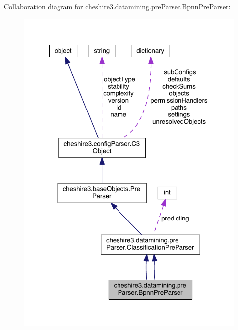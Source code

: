 Collaboration diagram for cheshire3.\-datamining.\-pre\-Parser.\-Bpnn\-Pre\-Parser\-:
\nopagebreak
\begin{figure}[H]
\begin{center}
\leavevmode
\includegraphics[width=325pt]{classcheshire3_1_1datamining_1_1pre_parser_1_1_bpnn_pre_parser__coll__graph}
\end{center}
\end{figure}

